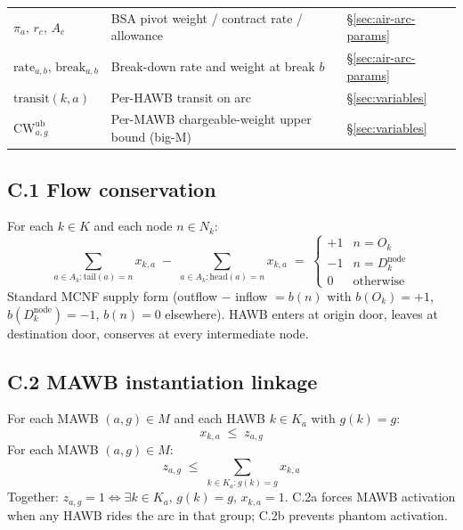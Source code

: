 \documentclass[11pt,a4paper]{article}
\theoremstyle{definition}
\begin{document}
\begin{table}[H]
\begin{tabular}{lp{9cm}p{3.5cm}}
$\pi_a,\, r_c,\, A_c$ & BSA pivot weight / contract rate / allowance & \S\ref{sec:air-arc-params} \\
$\text{rate}_{a,b},\, \text{break}_{a,b}$ & Break-down rate and weight at break $b$ & \S\ref{sec:air-arc-params} \\
$\text{transit}(k, a)$ & Per-HAWB transit on arc & \S\ref{sec:variables} \\
$\text{CW}^{\text{ub}}_{a,g}$ & Per-MAWB chargeable-weight upper bound (big-M) & \S\ref{sec:variables} \\
\bottomrule
\end{tabular}
\end{table}

\subsection*{C.1 Flow conservation}

For each $k \in K$ and each node $n \in N_k$:
\begin{equation}
  \sum_{a \in A_k : \text{tail}(a) = n} x_{k,a}
  \;-\;
  \sum_{a \in A_k : \text{head}(a) = n} x_{k,a}
  \;=\;
  \begin{cases}
    +1 & n = O_k \\
    -1 & n = D_k^{\text{node}} \\
    0  & \text{otherwise}
  \end{cases}
  \label{eq:C1}
\end{equation}
Standard MCNF supply form (outflow $-$ inflow $= b(n)$ with $b(O_k) = +1$,
$b(D_k^{\text{node}}) = -1$, $b(n) = 0$ elsewhere). HAWB enters at origin
door, leaves at destination door, conserves at every intermediate node.

\subsection*{C.2 MAWB instantiation linkage}

For each MAWB $(a, g) \in M$ and each HAWB $k \in K_a$ with $g(k) = g$:
\begin{equation}
  x_{k,a} \;\leq\; z_{a,g}
  \tag{C.2a} \label{eq:C2a}
\end{equation}
For each MAWB $(a, g) \in M$:
\begin{equation}
  z_{a,g} \;\leq\; \sum_{k \in K_a : g(k) = g} x_{k,a}
  \tag{C.2b} \label{eq:C2b}
\end{equation}
Together: $z_{a,g} = 1 \iff \exists k \in K_a,\, g(k) = g,\, x_{k,a} = 1$.
C.2a forces MAWB activation when any HAWB rides the arc in that group; C.2b
prevents phantom activation.
\end{document}
